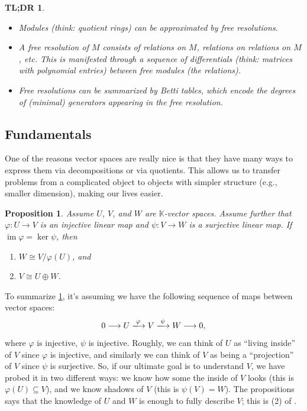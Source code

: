 \documentclass[12pt,a4paper]{article}
\newcommand{\KK}{\mathbb{K}}
\DeclareMathOperator{\image}{im}
\newtheorem{proposition}[theorem]{Proposition}
\newtheorem*{tldr}{TL;DR}
\theoremstyle{definition}
\numberwithin{equation}{section}
\begin{document}
\begin{tldr}
    \phantom{ }
    \begin{itemize}
        \item Modules (think: quotient rings) can be approximated by \emph{free resolutions}.
        
        \item A free resolution of $M$ consists of relations on $M$, relations on relations on $M$, etc.
        This is manifested through a sequence of \emph{differentials} (think: matrices with polynomial entries) between free modules (the relations).

        \item Free resolutions can be summarized by \emph{Betti tables}, which encode the degrees of (minimal) generators appearing in the free resolution.
    \end{itemize}
\end{tldr}

\vspace*{2.5cm}

\newpage
\subsection{Fundamentals}
One of the reasons vector spaces are really nice is that they have many ways to express them via decompositions or via quotients.
This allows us to transfer problems from a complicated object to objects with simpler structure (e.g., smaller dimension), making our lives easier.

\begin{proposition}\label{proposition:vector spaces split}
    Assume $U$, $V$, and $W$ are $\KK$-vector spaces.
    Assume further that $\varphi \colon U \to V$ is an injective linear map and $\psi \colon V \to W$ is a surjective linear map.
    If $\image{\varphi} = \ker{\psi}$, then
    \begin{enumerate}[label=(\arabic*)]
        \item $W \cong V / \varphi(U)$, and
        \item $V \cong U \oplus W$.
    \end{enumerate}
\end{proposition}

To summarize \cref{proposition:vector spaces split}, it's assuming we have the following sequence of maps between vector spaces:
\begin{equation*}
    0 \longrightarrow U \xlongrightarrow[]{\varphi} V \xlongrightarrow[]{\psi} W \longrightarrow 0,
\end{equation*}
where $\varphi$ is injective, $\psi$ is injective.
Roughly, we can think of $U$ as ``living inside'' of $V$ since $\varphi$ is injective, and similarly we can think of $V$ as being a ``projection'' of $V$ since $\psi$ is surjective.
So, if our ultimate goal is to understand $V$, we have probed it in two different ways: we know how some the inside of $V$ looks (this is $\varphi(U) \subseteq V$), and we know shadows of $V$ (this is $\psi(V) = W$).
The propositions says that the knowledge of $U$ and $W$ is enough to fully describe $V$; this is (2) of .
\end{document}
